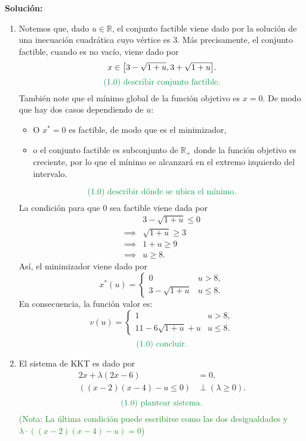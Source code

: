 \documentclass{article}
\begin{document}
\begin{enumerate}
		\textbf{Solución:}
		\begin{enumerate}
			\item Notemos que, dado \(u \in \mathbb{R}\), el conjunto factible viene dado por la solución de una inecuación cuadrática cuyo vértice es \(3\). Más precisamente, el conjunto factible, cuando es no vacío, viene dado por
				\[
					x \in \qty[3 - \sqrt{1 + u}, 3 + \sqrt{1 + u}].
				\]
				\[
					\text{\textcolor{ForestGreen}{(1.0) describir conjunto factible.}}
				\]
				También note que el mínimo global de la función objetivo es \(x = 0\). De modo que hay dos casos dependiendo de \(u\):
				\begin{itemize}
					\item O \(x^* = 0\) es factible, de modo que es el minimizador,
					\item o el conjunto factible es subconjunto de \(\mathbb{R}_+\) donde la función objetivo es creciente, por lo que el mínimo se alcanzará en el extremo izquierdo del intervalo.
				\end{itemize}
				\[
					\text{\textcolor{ForestGreen}{(1.0) describir dónde se ubica el mínimo.}}
				\]
				La condición para que \(0\) sea factible viene dada por
				\begin{align*}
					& 3 - \sqrt{1 + u} \leq 0 \\
					\implies & \sqrt{1 + u} \geq 3 \\
					\implies & 1 + u \geq 9 \\
					\implies & u \geq 8.
				\end{align*}
				Así, el minimizador viene dado por
				\[
					x^*(u) = \begin{cases}
						0 & u > 8, \\
						3 - \sqrt{1+u} & u \leq 8.
					\end{cases}
				\]
				En consecuencia, la función valor es:
				\[
					v(u)= \begin{cases}
						1 & u > 8, \\
						11 - 6 \sqrt{1 + u} + u & u \leq 8.
					\end{cases}
				\]
				\[
					\text{\textcolor{ForestGreen}{(1.0) concluir.}}
				\]
			\item El sistema de KKT es dado por
				\begin{align*}
					2x + \lambda(2x - 6) &= 0, \\
					\left((x - 2)(x - 4) - u \leq 0\right) &\perp (\lambda \geq 0).
				\end{align*}
				\[
					\text{\textcolor{ForestGreen}{(1.0) plantear sistema.}}
				\]
				\textcolor{ForestGreen}{(Nota: La última condición puede escribirse como las dos desigualdades y \(\lambda \cdot ((x - 2)(x - 4) - u) = 0\))}


\end{enumerate}
\end{enumerate}
\end{document}
